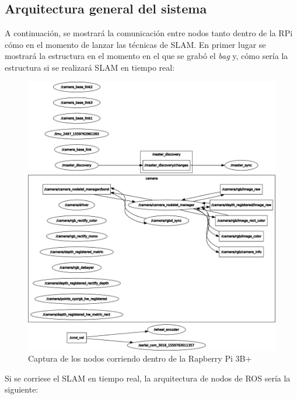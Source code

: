 \subsection{Arquitectura general del sistema}
A continuación, se mostrará la comunicación entre nodos tanto dentro de la RPi cómo en el momento de lanzar las técnicas de SLAM. En primer lugar se mostrará la estructura en el momento en el que se grabó
el \textit{bag} y, cómo sería la estructura si se realizará SLAM en tiempo real:
\begin{figure}[!ht]
    \centering
    \includegraphics[width=.8\textwidth]{images/rqt_graphs/rpi_onboardBAG.pdf}
    \caption{Captura de los nodos corriendo dentro de la Rapberry Pi 3B+}
    \label{rqt01}
\end{figure}

\newpage
Si se corriese el SLAM en tiempo real, la arquitectura de nodos de ROS sería la siguiente:

